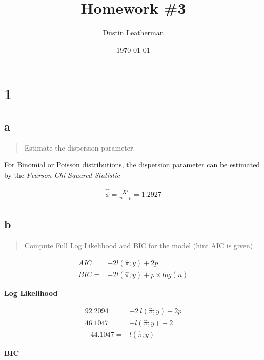 \documentclass[11pt]{article}
\author{Dustin Leatherman}
\date{\today}
\title{Homework \#3}
\begin{document}
\maketitle
\tableofcontents



\section{1}
\label{sec:org5a031bc}
\subsection{a}
\label{sec:orgb4404c1}
\begin{quote}
Estimate the dispersion parameter.
\end{quote}
For Binomial or Poisson distributions, the dispersion parameter can be estimated
by the \emph{Pearson Chi-Squared Statistic}

\begin{equation}
\begin{split}
\hat \phi = \frac{X^2}{n - p} = 1.2927
\end{split}
\end{equation}

\subsection{b}
\label{sec:org4d8a40a}
\begin{quote}
Compute Full Log Likelihood and BIC for the model (hint AIC is given)
\end{quote}

\begin{equation}
\begin{split}
AIC = & -2 l(\hat \pi; y) + 2p\\
BIC = & -2 l(\hat \pi; y) + p \times log(n)
\end{split}
\end{equation}

\textbf{Log Likelihood}

\begin{equation}
\begin{split}
92.2094 = & -2 \ l(\hat \pi ; y) + 2p\\
46.1047 = &  - l(\hat \pi; y) + 2\\
-44.1047 = & l(\hat \pi; y)
\end{split}
\end{equation}

\textbf{BIC}
\end{document}
